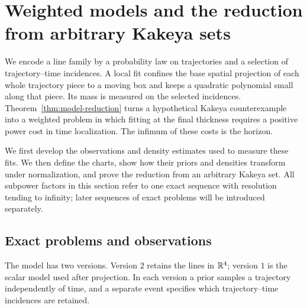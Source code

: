 \section{Weighted models and the reduction from arbitrary Kakeya sets}
\label{sec:framework}

We encode a line family by a probability law on trajectories and a
selection of trajectory--time incidences. A local fit confines the
base spatial projection of each whole trajectory piece to a moving
box and keeps a quadratic polynomial small along that piece. Its mass is measured on the
selected incidences.
Theorem~\ref{thm:model-reduction} turns a hypothetical Kakeya
counterexample into a weighted problem in which fitting at the final
thickness requires a positive power cost in time localization.
The infimum of these costs is the horizon.

We first develop the observations and density estimates used to measure
these fits. We then define the charts, show how their priors and densities
transform under normalization, and prove the reduction from an arbitrary
Kakeya set. All subpower factors in this section refer to one exact
sequence with resolution tending to infinity; later sequences of exact
problems will be introduced separately.

\subsection{Exact problems and observations}

The model has two versions. Version \(2\) retains the lines in
\(\mathbb R^4\); version \(1\) is the scalar model used after projection.
In each version a prior samples a trajectory independently of time,
and a separate event specifies which trajectory--time incidences
are retained.

